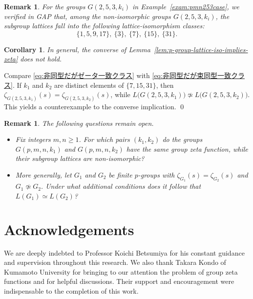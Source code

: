 \documentclass[onecolumn]{article}
\makeatletter
\numberwithin{equation}{section}
\theoremstyle{mytheoremstyle}
\newtheorem{remark}[thm]{Remark}
\newtheorem{cor}[thm]{Corollary}
\renewenvironment{proof}[1][\proofname]{%
  \par\normalfont 
  \topsep6pt\relax 
  \trivlist\item[\hskip\labelsep\itshape #1\@addpunct{.}]\ignorespaces
}{%
  \qed\endtrivlist\@endpefalse
}
\makeatother
\begin{document}
\begin{remark}
For the groups $G(2,5,3,k_{i})$ in Example~\ref{exam:pmn253case}, we verified in GAP
that, among the non-isomorphic groups $G(2,5,3,k_{i})$, the subgroup lattices
fall into the following lattice-isomorphism classes:
\begin{equation}\label{eq:非同型だが束同型一致クラス}
 \{1,5,9,17\},\ \{3\},\ \{7\},\ \{15\},\ \{31\}.
\end{equation}
\end{remark}



\begin{cor}
In general, the converse of Lemma~\ref{lem:p-group-lattice-iso-implies-zeta} does not hold.
\end{cor}

\begin{proof}
Compare \eqref{eq:非同型だがゼータ一致クラス} with \eqref{eq:非同型だが束同型一致クラス}.
If $k_{1}$ and $k_{2}$ are distinct elements of $\{7,15,31\}$, then
$\zeta_{G(2,5,3,k_{1})}(s)=\zeta_{G(2,5,3,k_{2})}(s)$,
while $L\bigl(G(2,5,3,k_{1})\bigr)\not\simeq L\bigl(G(2,5,3,k_{2})\bigr)$.
This yields a counterexample to the converse implication.
\end{proof}



\begin{remark}
The following questions remain open.
\begin{itemize}
  \item Fix integers $m,n\ge 1$.
  For which pairs $(k_{1},k_{2})$ do the groups $G(p,m,n,k_{1})$ and $G(p,m,n,k_{2})$
  have the same group zeta function, while their subgroup lattices are non-isomorphic?
  \item More generally, let $G_{1}$ and $G_{2}$ be finite $p$-groups with
  $\zeta_{G_{1}}(s)=\zeta_{G_{2}}(s)$ and $G_{1}\not\simeq G_{2}$.
  Under what additional conditions does it follow that $L(G_{1})\simeq L(G_{2})$?
\end{itemize}
\end{remark}






\section*{Acknowledgements}
We are deeply indebted to Professor Koichi Betsumiya for his constant guidance
and supervision throughout this research. We also thank Takara Kondo of Kumamoto University for bringing to our attention the problem of group zeta functions and for helpful discussions. Their support and encouragement were indispensable to the completion of this work.
\end{document}
